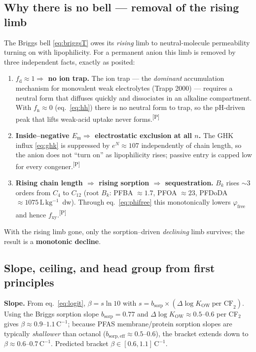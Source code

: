 \documentclass[11pt]{article}
\newcommand{\cP}{\textsuperscript{\textcolor{cPcol}{[P]}}}
\newcommand{\fxy}{\ensuremath{f_{\mathrm{xy}}}}
\newcommand{\Bk}{\ensuremath{B_{k}}}
\newcommand{\Em}{\ensuremath{E_{\mathrm{m}}}}
\newcommand{\fd}{\ensuremath{f_{\mathrm{d}}}}
\newcommand{\fnn}{\ensuremath{f_{\mathrm{n}}}}
\newcommand{\Kow}{\ensuremath{K_{\mathrm{OW}}}}
\newcommand{\Lkg}{\ensuremath{\,\mathrm{L\,kg^{-1}}}}
\newcommand{\ffree}{\ensuremath{\varphi_{\mathrm{free}}}}
\begin{document}
\subsection{Why there is no bell --- removal of the rising limb}
The Briggs bell \eqref{eq:briggsT} owes its \emph{rising} limb to neutral-molecule permeability
turning on with lipophilicity. For a permanent anion this limb is removed by three independent
facts, exactly as posited:
\begin{enumerate}[leftmargin=1.4em,itemsep=2pt]
\item \textbf{$\fd\approx1\Rightarrow$ no ion trap.} The ion trap --- the \emph{dominant}
accumulation mechanism for monovalent weak electrolytes (Trapp 2000) --- requires a neutral form
that diffuses quickly and dissociates in an alkaline compartment. With $\fnn\approx0$
(eq.~\ref{eq:hh}) there is no neutral form to trap, so the pH-driven peak that lifts weak-acid
uptake never forms.\cP
\item \textbf{Inside--negative $\Em\Rightarrow$ electrostatic exclusion at all $n$.} The GHK influx
\eqref{eq:ghk} is suppressed by $e^{N}\approx107$ independently of chain length, so the anion does
not ``turn on'' as lipophilicity rises; passive entry is capped low for every congener.\cP
\item \textbf{Rising chain length $\Rightarrow$ rising sorption $\Rightarrow$ sequestration.} $\Bk$
rises $\sim\!3$ orders from $C_4$ to $C_{12}$ (root $\Bk$: PFBA $\approx1.7$, PFOA $\approx23$,
PFDoDA $\approx1075\Lkg$~dw). Through eq.~\eqref{eq:phifree} this monotonically lowers $\ffree$ and
hence $\fxy$.\cP
\end{enumerate}
With the rising limb gone, only the sorption--driven \emph{declining} limb survives; the result is
a \textbf{monotonic decline}.

\subsection{Slope, ceiling, and head group from first principles}
\textbf{Slope.} From eq.~\eqref{eq:logit}, $\beta=s\ln10$ with $s=b_{\mathrm{sorp}}\times
(\Delta\log\Kow\ \text{per CF}_2)$. Using the Briggs sorption slope $b_{\mathrm{sorp}}=0.77$ and
$\Delta\log\Kow\approx0.5$--$0.6$ per CF$_2$ gives $\beta\approx0.9$--$1.1\,\mathrm{C^{-1}}$;
because PFAS membrane/protein sorption slopes are typically \emph{shallower} than octanol
($b_{\mathrm{sorp,eff}}\approx0.5$--$0.6$), the bracket extends down to
$\beta\approx0.6$--$0.7\,\mathrm{C^{-1}}$. Predicted bracket $\beta\in[0.6,1.1]\,\mathrm{C^{-1}}$.
\end{document}
